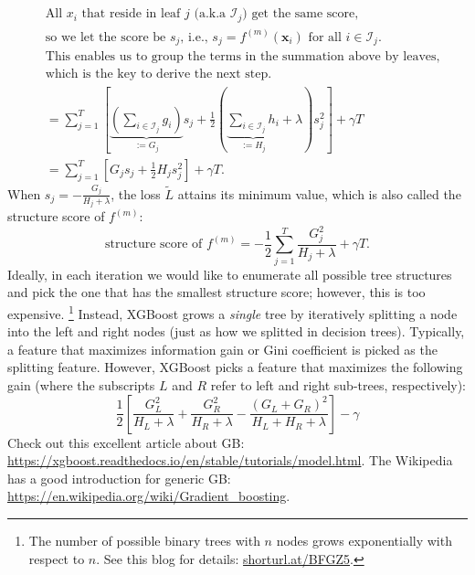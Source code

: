 {\begin{equation}
\begin{aligned}
{                    } \\
                    & \text{
                    All $x_i$ that reside in leaf $j$ (a.k.a  $\mathcal{I}_j$) get the same score,} \\
                    & \text{so we let the score be $s_j$, i.e., $s_j = f^{(m)}(\bm{x}_i)$ for all $i \in \mathcal{I}_j$.} \\
                    & \text{This enables us to group the terms in the summation above by leaves,} \\
                    & \text{which is the key to derive the next step.} \\
                    & = \sum_{j=1}^{T}{
                        \left[ \underbrace{\left(\sum_{i \in \mathcal{I}_j}^{}{g_i} \right)}_{:=G_j} s_j + \frac{1}{2}\left( \underbrace{\sum_{i \in \mathcal{I}_j}^{}{h_i}}_{:=H_j} + \lambda \right)s_j^2
                        \right] + \gamma T 
                    } \\
                    & = \sum_{j=1}^{T}{ \left[ G_j s_j + \frac{1}{2} H_j s_j^2 \right] } + \gamma T.
                \end{aligned}
            \end{equation}
        When $s_j = -\frac{G_j}{H_j + \lambda}$, the loss $\tilde{L}$ attains its minimum value, which is also called the structure score of $f^{(m)}$:
            \begin{equation}
                \text{structure score of $f^{(m)}$}= -\frac{1}{2}\sum_{j=1}^{T}{\frac{G_j^2}{H_j + \lambda}} + \gamma T.
            \end{equation}
        Ideally, in each iteration we would like to enumerate all possible tree structures and pick the one that has the smallest structure score; however, this is too expensive. \footnote{The number of possible binary trees with $n$ nodes grows exponentially with respect to $n$. See this blog for details: \url{shorturl.at/BFGZ5}.}
        Instead, XGBoost grows a \emph{single} tree by iteratively splitting a node into the left and right nodes (just as how we splitted in decision trees).
        Typically, a feature that maximizes information gain or Gini coefficient is picked as the splitting feature.
        However, XGBoost picks a feature that maximizes the following gain (where the subscripts $L$ and $R$ refer to left and right sub-trees, respectively):
            \begin{equation}
                \frac{1}{2}\left[ \frac{G_L^2}{H_L + \lambda} + \frac{G_R^2}{H_R + \lambda} - \frac{(G_L + G_R)^2}{H_L +  H_R + \lambda}  \right] - \gamma
            \end{equation}
        Check out this excellent article about GB: \url{https://xgboost.readthedocs.io/en/stable/tutorials/model.html}.
        The Wikipedia has a good introduction for generic GB: \url{https://en.wikipedia.org/wiki/Gradient_boosting}.
    
}
